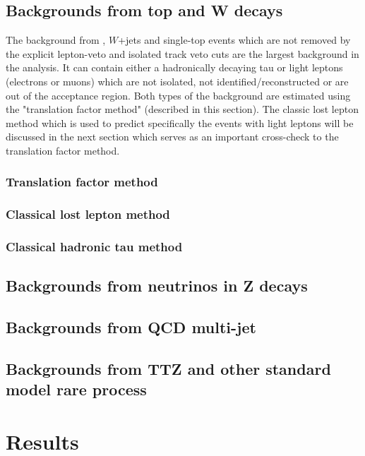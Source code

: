 \clearpage
\subsection{Backgrounds from top and W decays}
The background from \ttbar, $W$+jets and single-top events which are not removed by the explicit lepton-veto and isolated track veto cuts are the largest background in the analysis. It can contain either a hadronically decaying tau or light leptons (electrons or muons) which are not isolated, not identified/reconstructed or are out of the acceptance region. Both types of the background are estimated using the "translation factor method" (described in this section). The classic lost lepton method which is used to predict specifically the events with light leptons will be discussed in the next section which serves as an important cross-check to the translation factor method.

\clearpage
\subsubsection{Translation factor method}
\label{sec:c4bgtf}


\clearpage
\subsubsection{Classical lost lepton method}
\label{sec:c4bgll}


\clearpage
\subsubsection{Classical hadronic tau method}
\label{sec:c4bghadtau}


\clearpage
\subsection{Backgrounds from neutrinos in Z decays}
\label{sec:c4bgzinv}


\clearpage
\subsection{Backgrounds from QCD multi-jet}
\label{sec:c4bgqcd}


\clearpage
\subsection{Backgrounds from TTZ and other standard model rare process}
\label{sec:c4bgttzrare}


\clearpage
\section{Results}
\label{sec:c4results}

